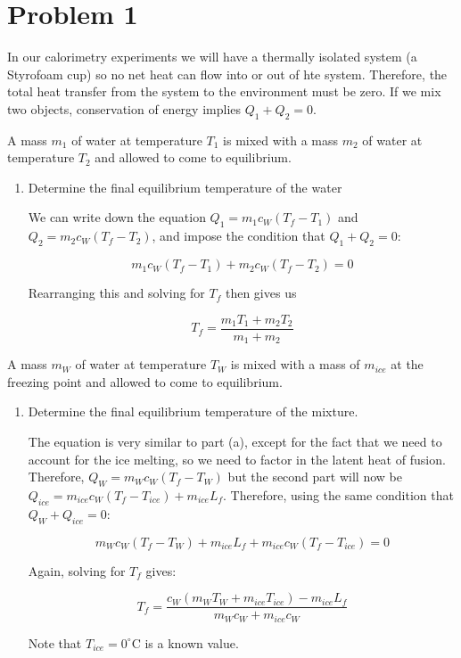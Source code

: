 \documentclass[10pt]{article}
\begin{document}
    \maketitle
    \section*{Problem 1}

    In our calorimetry experiments we will have a thermally isolated system (a Styrofoam cup) so no net heat can flow into or out of hte system. Therefore, the total heat transfer from the system to the environment must be zero. If we mix two objects, conservation of energy implies $Q_1 + Q_2 = 0$. 

    A mass $m_1$ of water at temperature $T_1$ is mixed with a mass $m_2$ of water at temperature $T_2$ and allowed to come to equilibrium. 

    \begin{enumerate}[start, label=\alph*)]
        \item Determine the final equilibrium temperature of the water
        
        \begin{solution}
            We can write down the equation $Q_1 = m_1c_W(T_f - T_1)$ and $Q_2 = m_2c_W(T_f - T_2)$, and impose the condition that $Q_1 + Q_2 = 0$: 

            \[ m_1c_W(T_f - T_1) + m_2c_W(T_f - T_2) = 0\]

            Rearranging this and solving for $T_f$ then gives us 

            \[ T_f = \frac{m_1T_1 + m_2T_2}{m_1 + m_2}\]
        \end{solution}
    \end{enumerate}

    A mass $m_W$ of water at temperature $T_W$ is mixed with a mass of $m_{ice}$ at the freezing point and allowed to come to equilibrium. 

    \begin{enumerate}[resume, label=\alph*)]
        \item Determine the final equilibrium temperature of the mixture. 
        
        \begin{solution}
            The equation is very similar to part (a), except for the fact that we need to account for the ice melting, so we need to factor in the latent heat of fusion. Therefore, $Q_W = m_Wc_W(T_f - T_W)$ but the second part will now be $Q_{ice} = m_{ice}c_W(T_f - T_{ice}) + m_{ice}L_f$. Therefore, using the same condition that $Q_W + Q_{ice} = 0$: 

            \[m_Wc_W(T_f - T_W) + m_{ice}L_f + m_{ice}c_W(T_f - T_{ice}) = 0\] 

            Again, solving for $T_f$ gives: 

            \[ T_f = \frac{c_W(m_WT_W + m_{ice}T_{ice}) - m_{ice}L_f}{m_Wc_W + m_{ice}c_W}\]

            Note that $T_{ice} = 0^\circ$C is a known value. 
        \end{solution}
    \end{enumerate}
\end{document}
